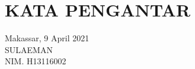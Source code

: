 \chapter*{KATA PENGANTAR}

\blindtext

\vspace{1cm}
\begin{flushright}
    Makassar, 9 April 2021\\
    \vspace{2.5cm}
    {SULAEMAN}\\
    NIM. {H13116002}
\end{flushright}